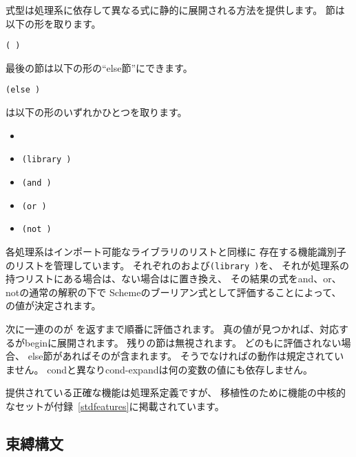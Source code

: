 \begin{entry}{%
}

\syntax
{}式型は処理系に依存して異なる式に静的に展開される方法を提供します。
節は以下の形を取ります。

{\tt(  \dotsfoo)}

最後の節は以下の形の``else節''にできます。

{\tt(else  \dotsfoo)}

は以下の形のいずれかひとつを取ります。

\begin{itemize}
\item {\tt{}}
\item {\tt(library )}
\item {\tt(and  \dotsfoo)}
\item {\tt(or  \dotsfoo)}
\item {\tt(not )}
\end{itemize}

\semantics
各処理系はインポート可能なライブラリのリストと同様に
存在する機能識別子のリストを管理しています。
それぞれのおよび{\tt(library )}を、
それが処理系の持つリストにある場合は\schtrue{}、ない場合は\schfalse{}に置き換え、
その結果の式を{\cf and}、{\cf or}、{\cf not}の通常の解釈の下で
Schemeのブーリアン式として評価することによって、
の値が決定されます。

次に一連ののが
\schtrue{}を返すまで順番に評価されます。
真の値が見つかれば、対応するが{\cf begin}に展開されます。
残りの節は無視されます。
どのも\schtrue{}に評価されない場合、
else節があればそのが含まれます。
そうでなければの動作は規定されていません。
{\cf cond}と異なり{\cf cond-expand}は何の変数の値にも依存しません。

提供されている正確な機能は処理系定義ですが、
移植性のために機能の中核的なセットが付録~\ref{stdfeatures}に掲載されています。

\end{entry}

\subsection{束縛構文}
\label{bindingsection}

